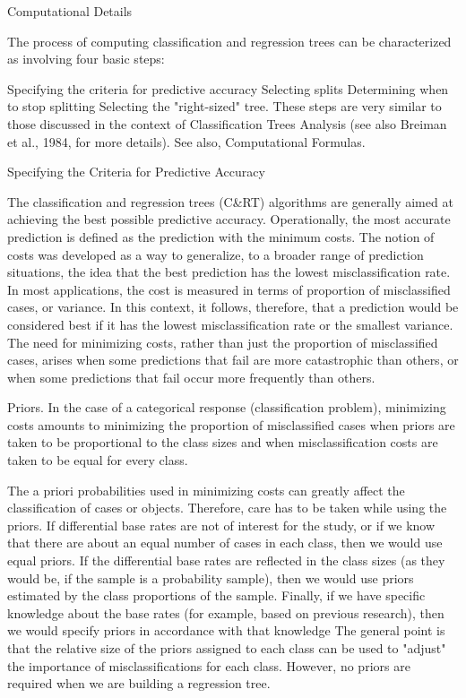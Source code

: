 Computational Details

The process of computing classification and regression trees can be characterized as involving four basic steps:

Specifying the criteria for predictive accuracy
Selecting splits
Determining when to stop splitting
Selecting the "right-sized" tree.
These steps are very similar to those discussed in the context of Classification Trees Analysis (see also Breiman et al., 1984, for more details). See also, Computational Formulas.

 

Specifying the Criteria for Predictive Accuracy

The classification and regression trees (C&RT) algorithms are generally aimed at achieving the best possible predictive accuracy. Operationally, the most accurate prediction is defined as the prediction with the minimum costs. The notion of costs was developed as a way to generalize, to a broader range of prediction situations, the idea that the best prediction has the lowest misclassification rate. In most applications, the cost is measured in terms of proportion of misclassified cases, or variance. In this context, it follows, therefore, that a prediction would be considered best if it has the lowest misclassification rate or the smallest variance. The need for minimizing costs, rather than just the proportion of misclassified cases, arises when some predictions that fail are more catastrophic than others, or when some predictions that fail occur more frequently than others.

Priors. In the case of a categorical response (classification problem), minimizing costs amounts to minimizing the proportion of misclassified cases when priors are taken to be proportional to the class sizes and when misclassification costs are taken to be equal for every class.

The a priori probabilities used in minimizing costs can greatly affect the classification of cases or objects. Therefore, care has to be taken while using the priors. If differential base rates are not of interest for the study, or if we know that there are about an equal number of cases in each class, then we would use equal priors. If the differential base rates are reflected in the class sizes (as they would be, if the sample is a probability sample), then we would use priors estimated by the class proportions of the sample. Finally, if we have specific knowledge about the base rates (for example, based on previous research), then we would specify priors in accordance with that knowledge The general point is that the relative size of the priors assigned to each class can be used to "adjust" the importance of misclassifications for each class. However, no priors are required when we are building a regression tree.

